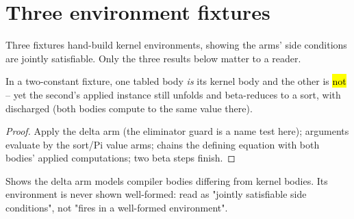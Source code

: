 \section{Three environment fixtures}
\label{sec:source:witnesses}

Three fixtures hand-build kernel environments, showing the arms' side conditions are jointly
satisfiable. Only the three results below matter to a reader.

\begin{proposition}
\label{prop:DeltaWitness-seval_sel_applied}
\leanok
{}
 In a two-constant fixture, one tabled body \emph{is} its kernel body and the other
is \hl{not} -- yet the second's applied instance still unfolds and beta-reduces to a sort, with
 discharged (both bodies compute to the same value there).
\end{proposition}
\begin{proof}
\leanok
{}
 Apply the delta arm (the eliminator guard is a name test here); arguments evaluate by
the sort/Pi value arms;  chains the defining equation with both bodies' applied
computations; two beta steps finish.
\end{proof}

\begin{remark}
 Shows the delta arm models compiler bodies differing from kernel bodies. Its
environment is never shown well-formed: read as "jointly satisfiable side conditions", not "fires
in a well-formed environment".
\end{remark}

